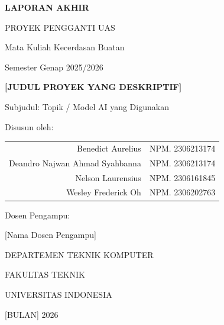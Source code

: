 \documentclass[11pt,a4paper,oneside]{report}
\begin{document}
\begin{titlepage}
\centering
\vspace*{1cm}

{\Large\bfseries LAPORAN AKHIR \par}
{\large PROYEK PENGGANTI UAS \par}
\vspace{0.3cm}
{\large Mata Kuliah Kecerdasan Buatan \par}
{\large Semester Genap 2025/2026 \par}

\vspace{2cm}


\vspace{1.5cm}

{\LARGE\bfseries [JUDUL PROYEK YANG DESKRIPTIF] \par}
\vspace{0.5cm}
{\large Subjudul: Topik / Model AI yang Digunakan \par}

\vspace{2.5cm}

{\large Disusun oleh: \par}
\vspace{0.5cm}
\begin{tabular}{rl}
{Benedict Aurelius} & NPM. 2306213174 \\
{Deandro Najwan Ahmad Syahbanna}& NPM. 2306213174 \\
{Nelson Laurensius} & NPM. 2306161845 \\
{Wesley Frederick Oh} & NPM. 2306202763 \\
\end{tabular}

\vspace{2cm}

{\large Dosen Pengampu: \par}
{\large [Nama Dosen Pengampu] \par}

\vfill

{\large DEPARTEMEN TEKNIK KOMPUTER \par}
{\large FAKULTAS TEKNIK \par}
{\large UNIVERSITAS INDONESIA \par}
{\large [BULAN] 2026 \par}
\end{titlepage}
\end{document}
